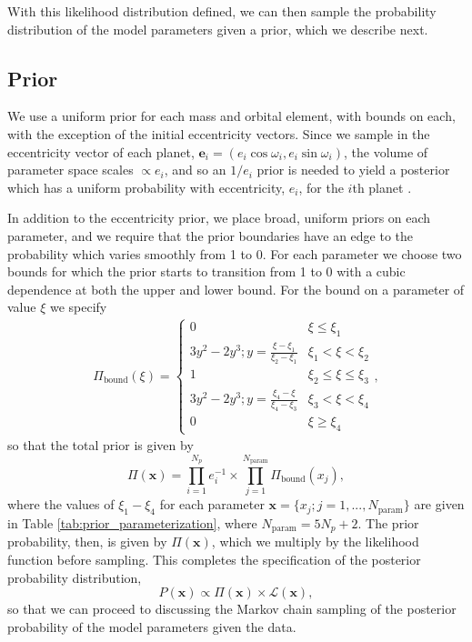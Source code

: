 \documentclass[twocolumn]{aastex63}
\begin{document}
With this likelihood distribution
defined, we can then sample the probability distribution of
the model parameters given a prior, which we describe next.

\subsection{Prior}

We use a uniform prior for each mass and orbital element,
with bounds on each, with the exception of the initial eccentricity vectors.
Since we sample in the eccentricity vector of each planet, $\mathbf{e}_i = (e_i\cos{\omega_i},e_i\sin{\omega_i})$, the volume
of parameter space scales $\propto e_i$, and so an $1/e_i$ prior is needed to
yield a posterior which has a uniform probability with eccentricity, $e_i$,
for the $i$th planet
\citep{Eastman2013}.

In addition to the eccentricity prior, we place broad, uniform priors on each parameter, and we require that
the prior boundaries have an edge to the probability which varies smoothly from 1 to 0.  For each parameter
we choose two bounds for which the prior starts to transition from 1 to 0 with a cubic dependence at both
the upper and lower bound.  For the  bound on a parameter of value $\xi$ we specify
\begin{eqnarray}
    \Pi_\mathrm{bound}(\xi) =
    \begin{cases}
        0                                            & \xi {\le} \xi_1             \\
        3y^2-2y^3; y = \frac{\xi-\xi_1}{\xi_2-\xi_1} & \xi_1 {<} \xi {<} \xi_2     \\
        1                                            & \xi_2 {\le} \xi {\le} \xi_3 \\
        3y^2-2y^3; y = \frac{\xi_4-\xi}{\xi_4-\xi_3} & \xi_3{<} \xi {<} \xi_4      \\
        0                                            & \xi {\ge} \xi_4
    \end{cases},
\end{eqnarray}
so that the total prior is given by
\begin{equation}
    \Pi(\mathbf{x}) = \prod_{i=1}^{N_p} e_i^{-1} {\times} \prod_{j=1}^{N_\mathrm{param}} \Pi_\mathrm{bound}(x_j),
\end{equation}
where the values of $\xi_1{-}\xi_4$ for each parameter
$\mathbf{x} {=} \{x_j; j{=} 1,...,N_\mathrm{param}\}$ are given in Table
\ref{tab:prior_parameterization}, where $N_\mathrm{param} = 5 N_p + 2$.
The prior probability, then, is given by $\Pi(\mathbf{x})$, which we
multiply by the likelihood function before sampling.
This completes the specification of the posterior probability distribution,
\begin{equation}
    P(\mathbf{x}) \propto \Pi(\mathbf{x}) \times \mathcal{L}(\mathbf{x}),
\end{equation}
so that we can proceed to discussing the Markov chain sampling of the posterior probability of the model parameters given the data.
\end{document}
